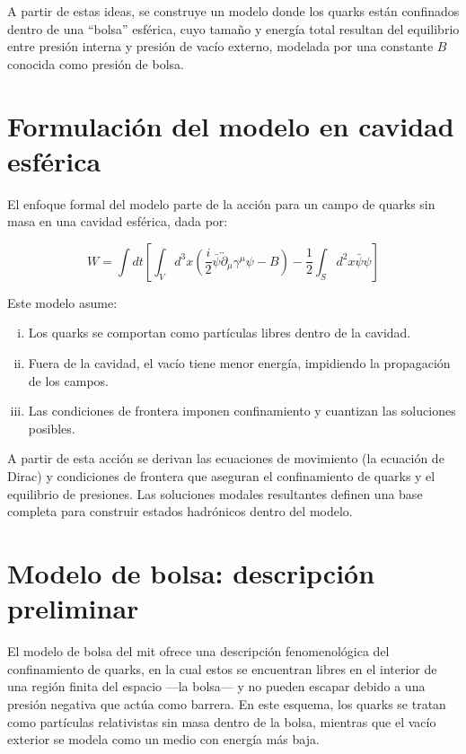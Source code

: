A partir de estas ideas, se construye un modelo donde los quarks están confinados dentro de una “bolsa” esférica, cuyo tamaño y energía total resultan del equilibrio entre presión interna y presión de vacío externo, modelada por una constante \( B \) conocida como presión de bolsa.

\section{Formulación del modelo en cavidad esférica}

El enfoque formal del modelo parte de la acción para un campo de quarks sin masa en una cavidad esférica, dada por:

\begin{equation}
W = \int dt \left[ \int_{V} d^3x \left( \frac{i}{2} \bar{\psi} \overleftrightarrow{\partial}_{\mu} \gamma^{\mu} \psi - B \right) - \frac{1}{2} \int_{S} d^2x \bar{\psi} \psi \right]
\end{equation}

Este modelo asume:

\begin{enumerate}[i.]
\item Los quarks se comportan como partículas libres dentro de la cavidad.
\item Fuera de la cavidad, el vacío tiene menor energía, impidiendo la propagación de los campos.
\item Las condiciones de frontera imponen confinamiento y cuantizan las soluciones posibles.
\end{enumerate}

A partir de esta acción se derivan las ecuaciones de movimiento (la ecuación de Dirac) y condiciones de frontera que aseguran el confinamiento de quarks y el equilibrio de presiones. Las soluciones modales resultantes definen una base completa para construir estados hadrónicos dentro del modelo.

\section{Modelo de bolsa: descripción preliminar}

El modelo de bolsa del \gls{mit} ofrece una descripción fenomenológica del confinamiento de quarks, en la cual estos se encuentran libres en el interior de una región finita del espacio —la bolsa— y no pueden escapar debido a una presión negativa que actúa como barrera. En este esquema, los quarks se tratan como partículas relativistas sin masa dentro de la bolsa, mientras que el vacío exterior se modela como un medio con energía más baja.

